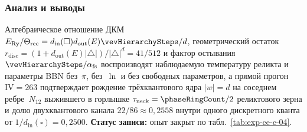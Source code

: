 \subsubsection*{Анализ и выводы}
Алгебраическое отношение ДКМ $E_{\mathrm{Ry}}/\Theta_{\mathrm{rec}} = d_{\mathrm{in}}(\square)d_{\mathrm{out}}(E)\vevHierarchySteps/d$, геометрический остаток $r_{\mathrm{disc}} = (1 + d_{\mathrm{out}}(E)|\triangle|)/|\triangle|^d = 41/512$ и фактор остывания $\vevHierarchySteps/\alpha_{\mathrm{fs}}$ воспроизводят наблюдаемую температуру реликта и параметры BBN без~$\pi$, без~$\ln$ и без свободных параметров, а прямой прогон $\mathrm{IV}=263$ подтверждает рождение трёхквантового ядра $|w|=d$ на соседнем ребре~$N_{12}$ выжившего в горлышке $\tau_{\mathrm{neck}}=\phaseRingCount/2$ реликтового зерна и долю двухквантового канала $22/86 \approx 0{,}2558$ внутри одного дискретного кванта от $1/d_{\mathrm{in}}(\square)=0{,}2500$.
\textbf{Статус записи:} опыт закрыт по табл.~\ref{tab:exp-ce-c-04}.
